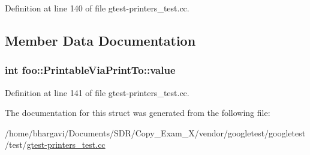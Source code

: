 Definition at line 140 of file gtest-\/printers\+\_\+test.\+cc.



\subsection{Member Data Documentation}
\subsubsection[{\texorpdfstring{value}{value}}]{\setlength{\rightskip}{0pt plus 5cm}int foo\+::\+Printable\+Via\+Print\+To\+::value}\hypertarget{structfoo_1_1_printable_via_print_to_a16f8c6420275d86f0d0112ca5a41bca2}{}\label{structfoo_1_1_printable_via_print_to_a16f8c6420275d86f0d0112ca5a41bca2}


Definition at line 141 of file gtest-\/printers\+\_\+test.\+cc.



The documentation for this struct was generated from the following file\+:\begin{DoxyCompactItemize}
\item 
/home/bhargavi/\+Documents/\+S\+D\+R/\+Copy\+\_\+\+Exam\+\_\+X/vendor/googletest/googletest/test/\hyperlink{gtest-printers__test_8cc}{gtest-\/printers\+\_\+test.\+cc}\end{DoxyCompactItemize}
